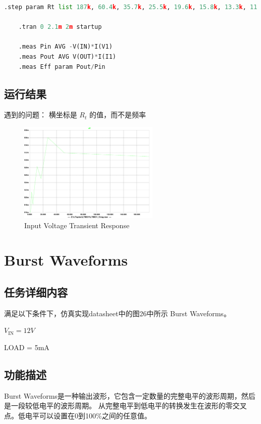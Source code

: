 \documentclass[lang=cn,10pt]{elegantbook}
\begin{document}
\begin{lstlisting}[language=Python, caption=G05]
    .step param Rt list 187k, 60.4k, 35.7k, 25.5k, 19.6k, 15.8k, 13.3k, 11.5k, 10k, 8.66k

    .tran 0 2.1m 2m startup
    
    .meas Pin AVG -V(IN)*I(V1)
    .meas Pout AVG V(OUT)*I(I1)
    .meas Eff param Pout/Pin
\end{lstlisting}

\subsection{运行结果}

遇到的问题： 横坐标是 $R_t$ 的值，而不是频率

\begin{figure}[!htb]
    \centering\includegraphics[page=1, width=0.6\textwidth]{figure/G05.pdf}
    \caption{Input Voltage Transient Response}
\end{figure}

\section{Burst Waveforms}

\subsection{任务详细内容}

满足以下条件下，仿真实现datasheet中的图26中所示 Burst Waveforms。

$V_{\text{IN}} = 12V$

LOAD = 5mA

\subsection{功能描述}

Burst Waveforms是一种输出波形，它包含一定数量的完整电平的波形周期，然后是一段较低电平的波形周期。
从完整电平到低电平的转换发生在波形的零交叉点。低电平可以设置在0到100\%之间的任意值。
\end{document}
